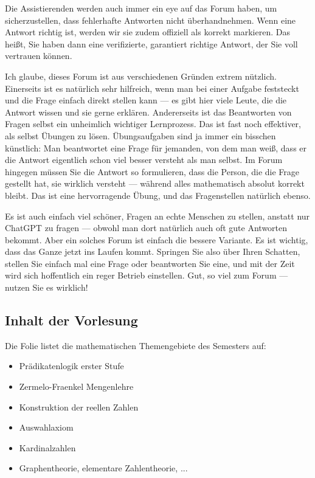 \begin{spoken-clean}[00:12:15 - 00:14:10]
Die Assistierenden werden auch immer ein eye auf das Forum haben, um sicherzustellen, dass fehlerhafte Antworten nicht überhandnehmen. Wenn eine Antwort richtig ist, werden wir sie zudem offiziell als korrekt markieren. Das heißt, Sie haben dann eine verifizierte, garantiert richtige Antwort, der Sie voll vertrauen können.

Ich glaube, dieses Forum ist aus verschiedenen Gründen extrem nützlich. Einerseits ist es natürlich sehr hilfreich, wenn man bei einer Aufgabe feststeckt und die Frage einfach direkt stellen kann --- es gibt hier viele Leute, die die Antwort wissen und sie gerne erklären. Andererseits ist das Beantworten von Fragen selbst ein unheimlich wichtiger Lernprozess. Das ist fast noch effektiver, als selbst Übungen zu lösen. Übungsaufgaben sind ja immer ein bisschen künstlich: Man beantwortet eine Frage für jemanden, von dem man weiß, dass er die Antwort eigentlich schon viel besser versteht als man selbst. Im Forum hingegen müssen Sie die Antwort so formulieren, dass die Person, die die Frage gestellt hat, sie wirklich versteht --- während alles mathematisch absolut korrekt bleibt. Das ist eine hervorragende Übung, und das Fragenstellen natürlich ebenso.

Es ist auch einfach viel schöner, Fragen an echte Menschen zu stellen, anstatt nur ChatGPT zu fragen --- obwohl man dort natürlich auch oft gute Antworten bekommt. Aber ein solches Forum ist einfach die bessere Variante. Es ist wichtig, dass das Ganze jetzt ins Laufen kommt. Springen Sie also über Ihren Schatten, stellen Sie einfach mal eine Frage oder beantworten Sie eine, und mit der Zeit wird sich hoffentlich ein reger Betrieb einstellen. Gut, so viel zum Forum --- nutzen Sie es wirklich!
\end{spoken-clean}

\subsection{Inhalt der Vorlesung}

\begin{meta-note}
Die Folie listet die mathematischen Themengebiete des Semesters auf:
\begin{itemize}
    \item Prädikatenlogik erster Stufe
    \item Zermelo-Fraenkel Mengenlehre
    \item Konstruktion der reellen Zahlen
    \item Auswahlaxiom
    \item Kardinalzahlen
    \item Graphentheorie, elementare Zahlentheorie, ...
\end{itemize}
\end{meta-note}

